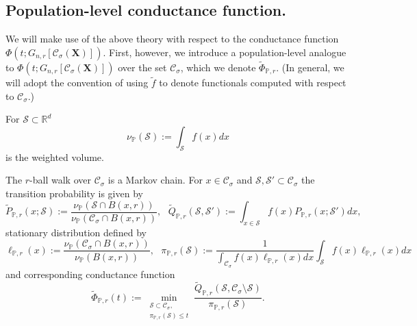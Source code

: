 \documentclass{article}
\newcommand{\Reals}{\mathbb{R}}
\newcommand{\Rd}{\Reals^d}
\newcommand{\1}{\mathbf{1}}
\newcommand{\Xbf}{\mathbf{X}}
\newcommand{\Pbb}{\mathbb{P}}
\newcommand{\Sset}{\mathcal{S}}
\newcommand{\Cset}{\mathcal{C}}
\newcommand{\Csig}{\Cset_{\sigma}}
\theoremstyle{aldenthm}
\begin{document}
\subsection{Population-level conductance function.}

We will make use of the above theory with respect to the conductance function $\Phi(t; G_{n,r}[\Csig(\Xbf)])$. First, however, we introduce a population-level analogue to $\Phi(t; G_{n,r}[\Csig(\Xbf)])$ over the set $\Csig$, which we denote $\widetilde{\Phi}_{\Pbb,r}$. (In general, we will adopt the convention of using $\widetilde{f}$ to denote functionals computed with respect to $\Csig$.)

For $\Sset \subset \Rd$
\begin{equation*}
\nu_{\Pbb}(\Sset) := \int_{\Sset} f(x) dx
\end{equation*} 
is the weighted volume.

The $r$-ball walk over $\Csig$ is a Markov chain. For $x \in \Csig$ and $\Sset, \Sset' \subset \Csig$ the transition probability is given by
\begin{equation*}
\widetilde{P}_{\Pbb, r}(x;\Sset) := \frac{\nu_\Pbb(\Sset \cap B(x,r))}{\nu_\Pbb(\Csig \cap B(x,r))}, ~~~ \widetilde{Q}_{\Pbb, r}(\Sset, \Sset') := \int_{x \in \Sset} f(x) P_{\Pbb, r}(x;\Sset') dx,
\end{equation*}
stationary distribution defined by
\begin{equation*}
\ell_{\Pbb,r}(x) := \frac{\nu_\Pbb(\Csig \cap B(x,r))}{\nu_{\Pbb}(B(x,r))}, ~~~ \pi_{\Pbb,r}(\Sset) := \frac{1}{\int_{\Csig} f(x) \ell_{\Pbb,r}(x) dx} \int_{\Sset} f(x) \ell_{\Pbb,r}(x) dx
\end{equation*}
and corresponding conductance function
\begin{equation*}
\widetilde{\Phi}_{\Pbb,r}(t) := \min_{\substack{\Sset \subset \Csig, \\ \pi_{\Pbb,r}(\Sset) \leq t} } \frac{\widetilde{Q}_{\Pbb,r}(\Sset, \Csig \setminus \Sset)}{\pi_{\Pbb,r}(\Sset)}.
\end{equation*}
\end{document}
